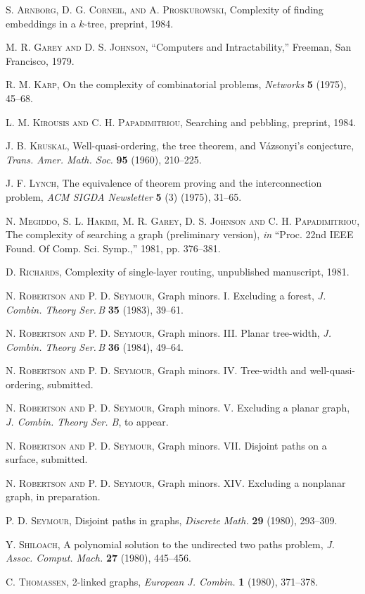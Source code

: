 
{
\newcommand{\refauth}{N. \textsc{Robertson and} P. D. \textsc{Seymour}}
\begin{list}{}{\leftmargin=18pt\itemsep=0pt\parsep=0pt}
\item[1.] S. \textsc{Arnborg}, D. G. \textsc{Corneil, and} A. \textsc{Proskurowski}, Complexity of finding embeddings in a $k$-tree, preprint, 1984.
\item[2.] M. R. \textsc{Garey and} D. S. \textsc{Johnson}, ``Computers and Intractability,'' Freeman, San Francisco, 1979.
\item[3.] R. M. \textsc{Karp}, On the complexity of combinatorial problems, \textit{Networks} \textbf{5} (1975), 45--68.
\item[4.] L. M. \textsc{Kirousis and} C. H. \textsc{Papadimitriou}, Searching and pebbling, preprint, 1984.
\item[5.] J. B. \textsc{Kruskal}, Well-quasi-ordering, the tree theorem, and V\'azsonyi's conjecture, \textit{Trans. Amer. Math. Soc.} \textbf{95} (1960), 210--225.
\item[6.] J. F. \textsc{Lynch}, The equivalence of theorem proving and the interconnection problem, \textit{ACM SIGDA Newsletter} \textbf{5} (3) (1975), 31--65.
\item[7.] N. \textsc{Megiddo}, S. L. \textsc{Hakimi}, M. R. \textsc{Garey}, D. S. \textsc{Johnson and} C. H. \textsc{Papadimitriou}, The complexity of searching a graph (preliminary version), \textit{in} ``Proc. 22nd IEEE Found. Of Comp. Sci. Symp.,'' 1981, pp. 376--381.
\item[8.] D. \textsc{Richards}, Complexity of single-layer routing, unpublished manuscript, 1981.
\item[9.] \refauth, Graph minors. I. Excluding a forest, \textit{J. Combin. Theory Ser.\,B} \textbf{35} (1983), 39--61.
\item[10.] \refauth, Graph minors. III. Planar tree-width, \textit{J. Combin. Theory Ser.\,B} \textbf{36} (1984), 49--64.
\item[11.] \refauth, Graph minors. IV. Tree-width and well-quasi-ordering, submitted.
\item[12.] \refauth, Graph minors. V. Excluding a planar graph, \textit{J. Combin. Theory Ser. B}, to appear.
\item[13.] \refauth, Graph minors. VII. Disjoint paths on a surface, submitted.
\item[14.] \refauth, Graph minors. XIV. Excluding a nonplanar graph, in preparation.
\item[15.] P. D. \textsc{Seymour}, Disjoint paths in graphs, \textit{Discrete Math.} \textbf{29} (1980), 293--309.
\item[16.] Y. \textsc{Shiloach}, A polynomial solution to the undirected two paths problem, \textit{J. Assoc. Comput. Mach.} \textbf{27} (1980), 445--456.
\item[17.] C. \textsc{Thomassen}, 2-linked graphs, \textit{European J. Combin.} \textbf{1} (1980), 371--378.
\end{list}
\par}
